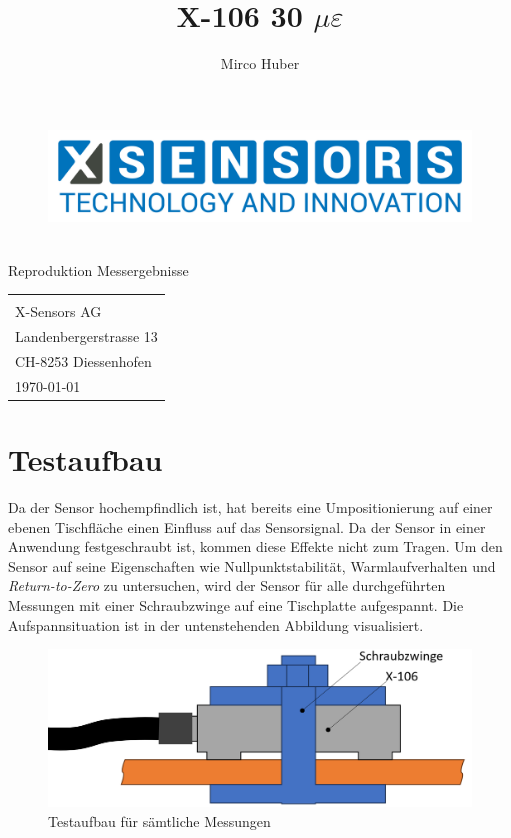 \documentclass[12pt,a4paper]{article}
\author{Mirco Huber}
\title{X-106 30 $\mu\varepsilon$}
\newcommand{\subtitle}{Reproduktion Messergebnisse}
\begin{document}
	\thispagestyle{empty}
	\begin{titlepage}
		\begin{figure}[H]
			\centering
			\includegraphics[width=.5\linewidth]{Logos/X-SENSORS-Logo_Slogan_EN_Transparent.png}
		\end{figure}
		\vspace*{3cm}
		\begin{center}
			\Huge {\thetitle} \\\vspace*{.5cm}
			\small {\subtitle}
		\end{center}
		\vspace{12cm}
		\hspace{.6\linewidth} 
		\begin{tabular}{l}	
			\small{\theauthor} \\[.5pt]  
			\small{X-Sensors AG} \\ 
			\small{Landenbergerstrasse 13} \\
			\small{CH-8253 Diessenhofen} \\ [.5cm] 	
			\today
		\end{tabular}
	\end{titlepage}

	\newpage
	\setcounter{page}{1}
	\pagestyle{fancy}
	
	
	
	\section{Testaufbau}
	Da der Sensor hochempfindlich ist, hat bereits eine Umpositionierung auf einer ebenen Tischfläche einen Einfluss auf das Sensorsignal. Da der Sensor in einer Anwendung festgeschraubt ist, kommen diese Effekte nicht zum Tragen. Um den Sensor auf seine Eigenschaften wie Nullpunktstabilität, Warmlaufverhalten und \textit{Return-to-Zero} zu untersuchen, wird der Sensor für alle durchgeführten Messungen mit einer Schraubzwinge auf eine Tischplatte aufgespannt. Die Aufspannsituation ist in der untenstehenden Abbildung visualisiert.
	\begin{figure}[H]
		\centering
		\includegraphics[width=1\linewidth]{Bilder/Aufbau}
		\caption{Testaufbau für sämtliche Messungen}
		\label{fig:aufbau}
	\end{figure}
	
\end{document}
